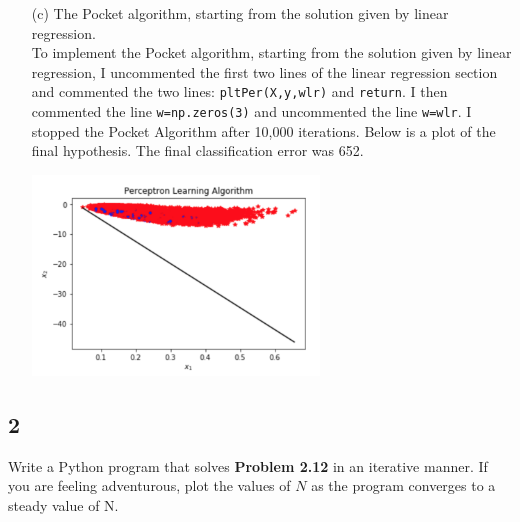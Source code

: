 \documentclass[a4paper]{article}
\begin{document}
\begin{itemize}
\begin{center}
    \end{center}
    \item[(c)] The Pocket algorithm, starting from the solution given by linear regression.\\
    To implement the Pocket algorithm, starting from the solution given by linear regression, I 
    uncommented the first two lines of the linear regression section and commented the two lines: 
    \verb|pltPer(X,y,wlr)| and \verb|return|.  I then commented the line \verb|w=np.zeros(3)| 
    and uncommented the line \verb|w=wlr|.  I stopped the Pocket Algorithm after 10,000 iterations.  
    Below is a plot of the final hypothesis.  The final classification error was 652.
    \begin{center}
        \includegraphics[width=0.6\textwidth]{c-Pocket.jpg}
    \end{center}
\end{itemize}


\subsection{2} Write a Python program that solves \textbf{Problem 2.12} in an iterative manner.  
If you are feeling adventurous, plot the values of $N$ as the program converges to a steady 
value of N.\\
\end{document}
